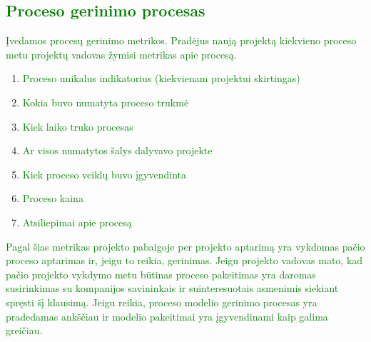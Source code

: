 \documentclass{VUMIFPSkursinis}
\begin{document}
	\subsection{\textcolor{green}{Proceso gerinimo procesas}}
		\textcolor{green}{Įvedamos procesų gerinimo metrikos.}
		\textcolor{green}{Pradėjus naują projektą kiekvieno proceso metu projektų vadovas žymisi metrikas apie procesą.}
			\begin{enumerate}
				\item{\textcolor{green}{Proceso unikalus indikatorius (kiekvienam projektui skirtingas)}}
				\item{\textcolor{green}{Kokia buvo numatyta proceso trukmė}}
				\item{\textcolor{green}{Kiek laiko truko procesas}}
				\item{\textcolor{green}{Ar visos numatytos šalys dalyvavo projekte}}
				\item{\textcolor{green}{Kiek proceso veiklų buvo įgyvendinta}}
				\item{\textcolor{green}{Proceso kaina}}
				\item{\textcolor{green}{Atsiliepimai apie procesą}}
			\end{enumerate}
		\textcolor{green}{Pagal šias metrikas projekto pabaigoje per projekto aptarimą yra vykdomas pačio proceso aptarimas ir, jeigu to reikia, gerinimas.
				Jeigu projekto vadovas mato, kad pačio projekto vykdymo metu būtinas proceso pakeitimas yra daromas susirinkimas su kompanijos savininkais ir suinteresuotais asmenimis siekiant spręsti šį klausimą. 
				Jeigu reikia, proceso modelio gerinimo procesas yra pradedamas ankščiau ir modelio pakeitimai yra įgyvendinami kaip galima greičiau.}
\end{document}

